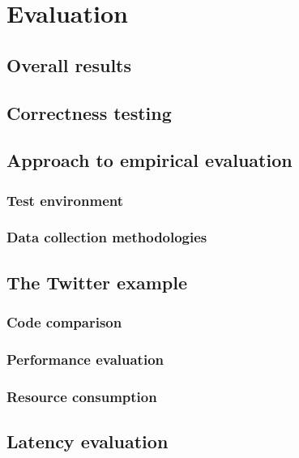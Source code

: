 \chapter{Evaluation}

\section{Overall results}

\section{Correctness testing}

\section{Approach to empirical evaluation}

\subsection{Test environment}

\subsection{Data collection methodologies}

\section{The Twitter example}

\subsection{Code comparison}

\subsection{Performance evaluation}

\subsection{Resource consumption}

\section{Latency evaluation}

